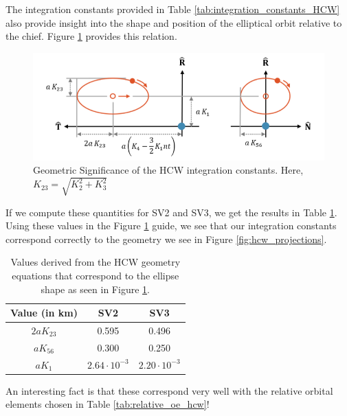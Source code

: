 The integration constants provided in Table \ref{tab:integration_constants_HCW} also provide insight into the shape and position of the elliptical orbit relative to the chief. Figure \ref{fig:hcw_gemeotry} provides this relation. 

\begin{figure}[htpb]
    \centering
    \includegraphics[width=0.75\linewidth]{LaTeX//PS3/hcw_integration_constants.png}
    \caption{Geometric Significance of the HCW integration constants. Here, $K_{23} = \sqrt{K_2^2 + K_3^2}$ \cite{willis2023analytical}}
    \label{fig:hcw_gemeotry}
\end{figure}

If we compute these quantities for SV2 and SV3, we get the results in Table \ref{tab:HCW_geometry_values}. Using these values in the Figure \ref{fig:hcw_gemeotry} guide, we see that our integration constants correspond correctly to the geometry we see in Figure \ref{fig:hcw_projections}.

\begin{table}[htpb]
    \centering
    \renewcommand{\arraystretch}{1.2}
    \begin{tabular}{c c c}
        \toprule
        \textbf{Value (in km)} & \textbf{SV2} & \textbf{SV3} \\
        \midrule
        $2aK_{23}$ & 0.595 & 0.496 \\
        $aK_{56}$ & 0.300 & 0.250 \\
        $aK_1$ & $2.64\cdot10^{-3}$& $2.20\cdot10^{-3}$\\
        \bottomrule
    \end{tabular}
    \caption{Values derived from the HCW geometry equations that correspond to the ellipse shape as seen in Figure \ref{fig:hcw_gemeotry}.}
    \label{tab:HCW_geometry_values}
\end{table}

An interesting fact is that these correspond very well with the relative orbital elements chosen in Table \ref{tab:relative_oe_hcw}!

